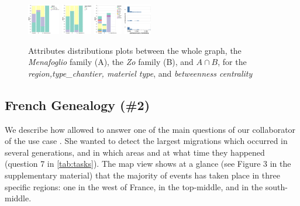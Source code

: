 \begin{figure}
    \centering


    \includegraphics[height=50px]{static/figures/ComBiNet/OriginalPaperFigures/CGF/MenaZoPlots/v2/region.pdf}
    \includegraphics[height=50px]{static/figures/ComBiNet/OriginalPaperFigures/CGF/MenaZoPlots/v2/type-chantier.pdf}
    \includegraphics[height=50px]{static/figures/ComBiNet/OriginalPaperFigures/CGF/MenaZoPlots/v2/materiel.pdf}
    \includegraphics[height=50px]{static/figures/ComBiNet/OriginalPaperFigures/CGF/MenaZoPlots/v2/BC_crop.pdf}

    \caption{Attributes distributions plots between the whole graph, the \textit{Menafoglio} family (A), the \textit{Zo} family (B), and $A\cap B$, for the \textit{region,type\_chantier,  materiel type}, and \textit{betweenness centrality}  \label{fig:useCasePascal}}
\end{figure}


\subsection{French Genealogy (\#2)}

We describe how \name allowed to answer one of the main questions of our collaborator of the use case \nicole. She wanted to detect the largest migrations which occurred in several generations, and in which areas and at what time they happened (question 7 in \autoref{tab:tasks}).
The map view shows at a glance (see Figure 3 in the supplementary material) that the majority of events has taken place in three specific regions: one in the west of France, in the top-middle, and in the south-middle.

